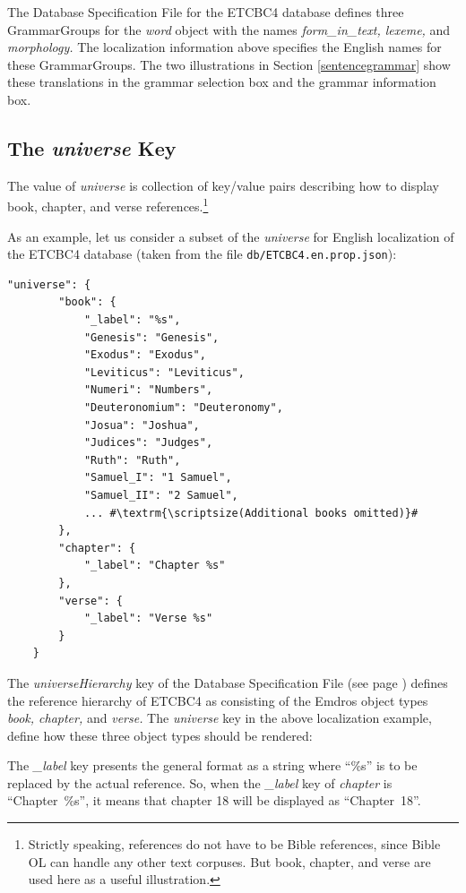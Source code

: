 \documentclass[11pt,oneside,a4paper]{memoir}
\begin{document}
The Database Specification File for the ETCBC4 database defines three GrammarGroups for the
\emph{word} object with the names \emph{form\_in\_text, lexeme,} and \emph{morphology.} The
localization information above specifies the English names for these GrammarGroups. The two
illustrations in Section \ref{sentencegrammar} show these translations in the grammar selection
box and the grammar information box.

\subsection{The \emph{universe} Key}\label{universe-loc}

The value of \emph{universe} is collection of key/value pairs describing how to display book,
chapter, and verse references.\footnote{Strictly speaking, references do not have to be Bible
  references, since Bible OL can handle any other text corpuses. But book, chapter, and verse are
  used here as a useful illustration.}

As an example, let us consider a subset of the \emph{universe} for English localization of
the ETCBC4 database (taken from the file \texttt{db/ETCBC4.en.prop.json}):

\begin{lstlisting}[escapechar=\#]
    "universe": {
        "book": {
            "_label": "%s",
            "Genesis": "Genesis",
            "Exodus": "Exodus",
            "Leviticus": "Leviticus",
            "Numeri": "Numbers",
            "Deuteronomium": "Deuteronomy",
            "Josua": "Joshua",
            "Judices": "Judges",
            "Ruth": "Ruth",
            "Samuel_I": "1 Samuel",
            "Samuel_II": "2 Samuel",
            ... #\textrm{\scriptsize(Additional books omitted)}#
        },
        "chapter": {
            "_label": "Chapter %s"
        },
        "verse": {
            "_label": "Verse %s"
        }
    }
\end{lstlisting}

The \emph{universeHierarchy} key of the Database Specification File (see page
\pageref{universe-hierarchy}) defines the reference hierarchy of ETCBC4 as consisting of the Emdros
object types \emph{book, chapter,} and \emph{verse.} The \emph{universe} key in the above localization
example, define how these three object types should be rendered:

The \emph{\_label} key presents the general format as a string where ``\%s'' is to be replaced by
the actual reference. So, when the \emph{\_label} key of \emph{chapter} is ``Chapter~\%s'', it means
that chapter 18 will be displayed as ``Chapter~18''.
\end{document}
